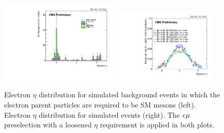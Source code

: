 \begin{figure}
\centering
\includegraphics[width=0.5\textwidth]{figures/large_eta/electronEtaBkgLightMesons.pdf}
\includegraphics[width=0.45\textwidth]{figures/large_eta/electronEtaSignal.pdf}
\caption{Electron $\eta$ distribution for simulated background events in which the electron parent particles are required to be SM mesons (left). Electron $\eta$ distribution for simulated \stoptolb events (right). The $e{\mu}$ preselection with a loosened $\eta$ requirement is applied in both plots.}
\label{large_eta_e}
\end{figure}